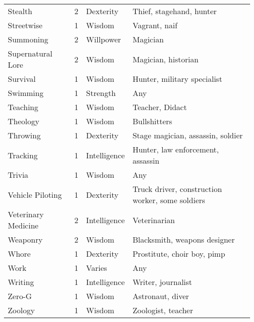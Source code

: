 \documentclass[twoside]{book}
\begin{document}
\begin{longtable}{p{1.25in}llp{12em}}
  \raggedright
           Stealth 
  &
   2 
  &
   Dexterity 
  &
   Thief, stagehand, hunter
           
  \tabularnewline
      
  \raggedright
           Streetwise 
  &
   1 
  &
   Wisdom 
  &
   Vagrant, naif 
  \tabularnewline
      
  \raggedright
           Summoning 
  &
   2 
  &
   Willpower 
  &
   Magician 
  \tabularnewline
      
  \raggedright
           Supernatural Lore 
  &
   2 
  &
   Wisdom 
  &
   Magician, historian
           
  \tabularnewline
      
  \raggedright
           Survival 
  &
   1 
  &
   Wisdom 
  &
   Hunter, military
           specialist 
  \tabularnewline
      
  \raggedright
           Swimming 
  &
   1 
  &
   Strength 
  &
   Any 
  \tabularnewline
      
  \raggedright
           Teaching 
  &
   1 
  &
   Wisdom 
  &
   Teacher, Didact 
  \tabularnewline
      
  \raggedright
           Theology 
  &
   1 
  &
   Wisdom 
  &
   Bullshitters 
  \tabularnewline
      
  \raggedright
           Throwing 
  &
   1 
  &
   Dexterity 
  &
   Stage magician, assassin,
           soldier 
  \tabularnewline
      
  \raggedright
           Tracking 
  &
   1 
  &
   Intelligence 
  &
   Hunter, law enforcement,
           assassin 
  \tabularnewline
      
  \raggedright
           Trivia 
  &
   1 
  &
   Wisdom 
  &
   Any 
  \tabularnewline
      
  \raggedright
           Vehicle Piloting 
  &
   1 
  &
   Dexterity 
  &
   Truck driver,
           construction worker, some soldiers 
  \tabularnewline
      
  \raggedright
           Veterinary Medicine 
  &
   2 
  &
   Intelligence 
  &
   Veterinarian 
  \tabularnewline
      
  \raggedright
           Weaponry 
  &
   2 
  &
   Wisdom 
  &
   Blacksmith, weapons
           designer 
  \tabularnewline
      
  \raggedright
           Whore 
  &
   1 
  &
   Dexterity 
  &
   Prostitute, choir boy,
           pimp 
  \tabularnewline
      
  \raggedright
           Work 
  &
   1 
  &
   Varies 
  &
   Any 
  \tabularnewline
      
  \raggedright
           Writing 
  &
   1 
  &
   Intelligence 
  &
   Writer, journalist
           
  \tabularnewline
      
  \raggedright
           Zero-G 
  &
   1 
  &
   Wisdom 
  &
   Astronaut, diver 
  \tabularnewline
      
  \raggedright
           Zoology 
  &
   1 
  &
   Wisdom 
  &
   Zoologist, teacher
           
  \tabularnewline
      
\end{longtable}
    
\end{document}
